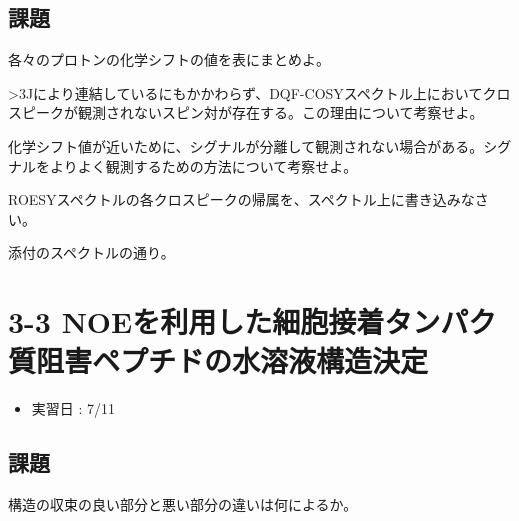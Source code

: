 \documentclass[a4paper,papersize,dvipdfmx]{jsarticle}
\begin{document}
\subsection*{課題}

\begin{tcolorbox}[colback=white,colbacktitle=black!10!white,coltitle=black,title={1}]
各々のプロトンの化学シフトの値を表にまとめよ。
\end{tcolorbox}



\begin{tcolorbox}[colback=white,colbacktitle=black!10!white,coltitle=black,title={2}]
>3Jにより連結しているにもかかわらず、DQF-COSYスペクトル上においてクロスピークが観測されないスピン対が存在する。この理由について考察せよ。
\end{tcolorbox}



\begin{tcolorbox}[colback=white,colbacktitle=black!10!white,coltitle=black,title={3}]
化学シフト値が近いために、シグナルが分離して観測されない場合がある。シグナルをよりよく観測するための方法について考察せよ。
\end{tcolorbox}


\begin{tcolorbox}[colback=white,colbacktitle=black!10!white,coltitle=black,title={4}]
ROESYスペクトルの各クロスピークの帰属を、スペクトル上に書き込みなさい。
\end{tcolorbox}

添付のスペクトルの通り。

\section*{3-3 NOEを利用した細胞接着タンパク質阻害ペプチドの水溶液構造決定}

\begin{itemize}
\item 実習日 : 7/11

\end{itemize}
\subsection*{課題}

\begin{tcolorbox}[colback=white,colbacktitle=black!10!white,coltitle=black,title={1}]
構造の収束の良い部分と悪い部分の違いは何によるか。
\end{tcolorbox}
\end{document}
